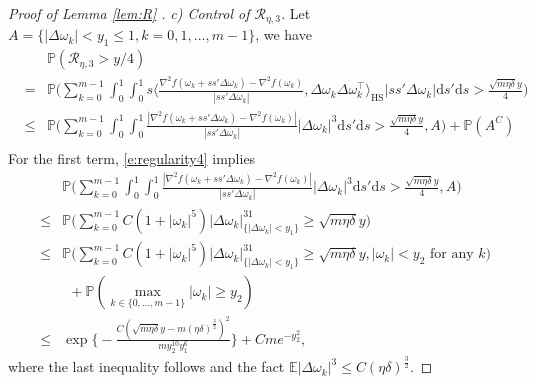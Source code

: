 \documentclass[12pt]{amsart}
\theoremstyle{definition}
\theoremstyle{remark}
\numberwithin{equation}{section}
\newcommand{\dif}{\mathrm{d}}
\newcommand{\E}{\mathbb{E}}            %
\newcommand{\Ll}{\langle}
\newcommand{\Rr}{\rangle}
\newcommand{\PP}{\mathbb{P}}
\begin{document}
\begin{proof}[Proof of Lemma \ref{lem:R} ]
	\textit{c) Control of $\mathcal{R}_{\eta,3}$.} Let $A=\{|\Delta\omega_k|<y_1\le1, k=0,1,...,m-1\}$, we have
	\begin{eqnarray*}
		&&\PP(\mathcal{R}_{\eta,3}>y/4)\\
		&=&\PP\Big(\sum_{k=0}^{m-1}
		\int_0^1\int_0^1s \big\Ll \frac{\nabla^2 f(\omega_k+ss'\Delta\omega_k)-\nabla^2f(\omega_k )}{|ss'\Delta\omega_k|}, \Delta \omega_k\Delta \omega_k^\top\big\Rr_\mathrm{HS}|ss'\Delta\omega_k|\dif s'\dif s>\frac{\sqrt{m\eta\delta}y}4
		\Big)\\
		&\le& \PP\Big(\sum_{k=0}^{m-1}
		\int_0^1\int_0^1  \frac{|\nabla^2 f(\omega_k+ss'\Delta\omega_k)-\nabla^2f(\omega_k )|}{|ss'\Delta\omega_k|} |\Delta \omega_k|^3\dif s'\dif s>\frac{\sqrt{m\eta\delta}y}4, A
		\Big)+\PP(A^C)\\
	\end{eqnarray*}
	For the first term, \eqref{e:regularity4} implies
			\begin{eqnarray*}
		&&\PP\Big(\sum_{k=0}^{m-1}
		\int_0^1\int_0^1  \frac{|\nabla^2 f(\omega_k+ss'\Delta\omega_k)-\nabla^2f(\omega_k )|}{|ss'\Delta\omega_k|} |\Delta \omega_k|^3\dif s'\dif s>\frac{\sqrt{m\eta\delta}y}4, A
		\Big)\\
		&\le& \PP\big(\sum_{k=0}^{m-1}
		C(1+|\omega_k|^5)|\Delta\omega_k|^31_{\{|\Delta\omega_k|<y_1\}}\ge \sqrt{m\eta\delta}y\big)\\
		&\le& \PP\big(\sum_{k=0}^{m-1}
		C(1+|\omega_k|^5)|\Delta\omega_k|^31_{\{|\Delta\omega_k|<y_1\}}\ge \sqrt{m\eta\delta}y, |\omega_k|<y_2 \text{ for any } k\big)\\
		&&~~+\PP(\max_{k\in\{0,...,m-1\}}|\omega_k|\ge y_2)\\
		&\le& \exp\big\{-\frac{C(\sqrt{m\eta\delta}y-m(\eta\delta)^{\frac32})^2}{my_2^{10}y_1^6}\big\}+Cme^{-y_2^2},
	\end{eqnarray*}
	where the last inequality follows  \cite[Theorem 2]{dedecker2015subgaussian} and the fact $\E|\Delta\omega_k|^3\le C(\eta\delta)^{\frac32}$. 
	
	
	
	
	

\end{proof}
\end{document}
